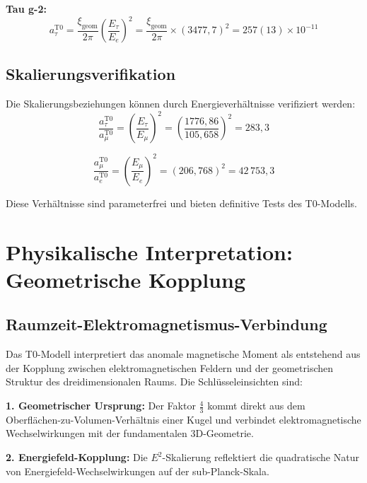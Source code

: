 \documentclass[12pt,a4paper]{report}
\newcommand{\xigeom}{\xi_{\text{geom}}}   %
\newcommand{\Ee}{E_e}                     %
\newcommand{\Emu}{E_\mu}                  %
\newcommand{\Etau}{E_\tau}                %
\begin{document}
\textbf{Tau g-2:}
\begin{equation}
	a_\tau^{\text{T0}} = \frac{\xigeom}{2\pi} \left(\frac{\Etau}{\Ee}\right)^2 = \frac{\xigeom}{2\pi} \times (3477,7)^2 = 257(13) \times 10^{-11}
	\label{eq:tau_g2}
\end{equation}

\subsection{Skalierungsverifikation}
\label{subsec:scaling_verification}

Die Skalierungsbeziehungen können durch Energieverhältnisse verifiziert werden:
\begin{equation}
	\frac{a_\tau^{\text{T0}}}{a_\mu^{\text{T0}}} = \left(\frac{\Etau}{\Emu}\right)^2 = \left(\frac{1776,86}{105,658}\right)^2 = 283,3
	\label{eq:tau_muon_ratio}
\end{equation}

\begin{equation}
	\frac{a_\mu^{\text{T0}}}{a_e^{\text{T0}}} = \left(\frac{\Emu}{\Ee}\right)^2 = (206,768)^2 = 42\,753,3
	\label{eq:muon_electron_ratio}
\end{equation}

Diese Verhältnisse sind parameterfrei und bieten definitive Tests des T0-Modells.

\section{Physikalische Interpretation: Geometrische Kopplung}
\label{sec:physical_interpretation}

\subsection{Raumzeit-Elektromagnetismus-Verbindung}
\label{subsec:spacetime_electromagnetic}

Das T0-Modell interpretiert das anomale magnetische Moment als entstehend aus der Kopplung zwischen elektromagnetischen Feldern und der geometrischen Struktur des dreidimensionalen Raums. Die Schlüsseleinsichten sind:

\textbf{1. Geometrischer Ursprung:}
Der Faktor $\frac{4}{3}$ kommt direkt aus dem Oberflächen-zu-Volumen-Verhältnis einer Kugel und verbindet elektromagnetische Wechselwirkungen mit der fundamentalen 3D-Geometrie.

\textbf{2. Energiefeld-Kopplung:}
Die $E^2$-Skalierung reflektiert die quadratische Natur von Energiefeld-Wechselwirkungen auf der sub-Planck-Skala.
\end{document}
